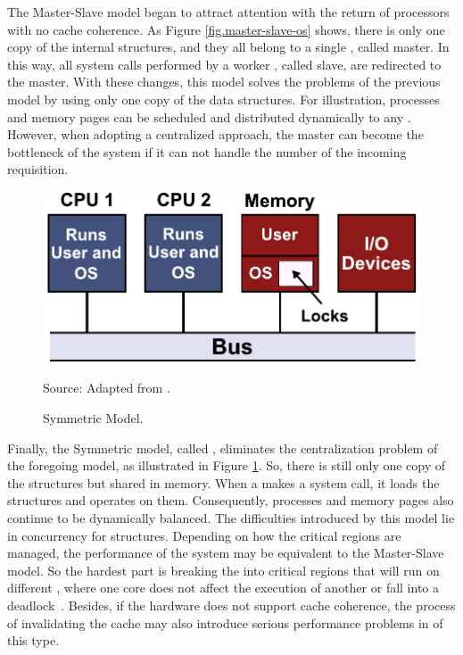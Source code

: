 			The Master-Slave model began to attract attention with the return of
			processors with no cache coherence.
			As Figure \ref{fig.master-slave-os} shows, there is only one copy of
			the internal \os structures, and they all belong to a single \cpu, called master.
			In this way, all system calls performed by a worker \cpu, called slave,
			are redirected to the master.
			With these changes, this model solves the problems of the previous model
			by using only one copy of the data structures.
			For illustration, processes and memory pages can be scheduled and
			distributed dynamically to any \cpus.
			However, when adopting a centralized approach, the master can become
			the bottleneck of the system if it can not handle the number of the
			incoming requisition.

			\begin{figure}[t]
				\centering
				\caption{Symmetric \os Model.}

				\includegraphics[width=.7\textwidth]{images/symmetric-os.pdf}

				Source: Adapted from \cite{tanenbaum:4ed}.

				\label{fig.smp-os}
			\end{figure}

			Finally, the Symmetric model, called \smp, eliminates the centralization
			problem of the foregoing model, as illustrated in Figure \ref{fig.smp-os}.
			So, there is still only one copy of the \os structures but shared in memory.
			When a \cpu makes a system call, it loads the structures and operates on them.
			Consequently, processes and memory pages also continue to be dynamically balanced.
			The difficulties introduced by this model lie in concurrency for \os structures.
			Depending on how the critical regions are managed, the performance of the system
			may be equivalent to the Master-Slave model. So the hardest part is breaking the
			\os into critical regions that will run on different \cpus, where one core does
			not affect the execution of another or fall into a deadlock~\cite{tanenbaum:4ed}.
			Besides, if the hardware does not support cache coherence, the process of
			invalidating the cache may also introduce serious performance problems in \oses of this type.

